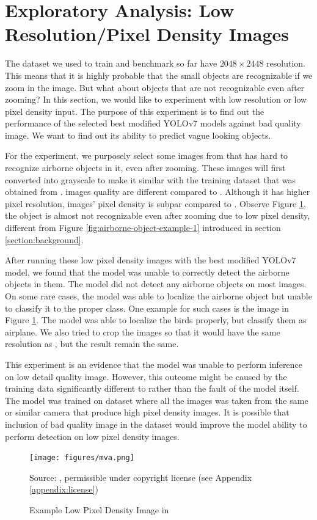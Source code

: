 \section{Exploratory Analysis: Low Resolution/Pixel Density Images}
The dataset we used to train and benchmark so far have $2048\times 2448$ resolution.
This means that it is highly probable that the small objects are recognizable if we zoom in the image.
But what about objects that are not recognizable even after zooming?
In this section, we would like to experiment with low resolution or low pixel density input.
The purpose of this experiment is to find out the performance of the selected best modified YOLOv7 models against
bad quality image. We want to find out its ability to predict vague looking objects.

For the experiment, we purposely select some images from \textcite{mva2023} that has hard to recognize airborne objects in it, even after zooming.
These images will first converted into grayscale to make it similar with the training dataset that was obtained from \textcite{aot_dataset}.
\textcite{mva2023} images quality are different compared to \textcite{aot_dataset}.
Although it has higher pixel resolution, \textcite{mva2023} images' pixel density is subpar compared to \textcite{aot_dataset}.
Observe Figure \ref{fig:mva}, the object is almost not recognizable even after zooming due to low pixel density, different from Figure \ref{fig:airborne-object-example-1} introduced in section \ref{section:background}.

After running these low pixel density images with the best modified YOLOv7 model, we found that the model was unable to correctly detect the airborne objects in them.
The model did not detect any airborne objects on most images. On some rare cases, the model was able to localize the airborne object but unable to classify it to the proper class.
One example for such cases is the image in Figure \ref{fig:mva}. The model was able to localize the birds properly, but classify them as airplane.
We also tried to crop the images so that it would have the same resolution as \textcite{aot_dataset}, but the result remain the same.

This experiment is an evidence that the model was unable to perform inference on low detail quality image.
However, this outcome might be caused by the training data significantly different to \textcite{mva2023} rather than the fault of the model itself.
The model was trained on dataset where all the images was taken from the same or similar camera that produce high pixel density images.
It is possible that inclusion of bad quality image in the dataset would improve the model ability to perform detection on low pixel density images.

\begin{figure}[btp]
  \centering
  \texttt{[image: figures/mva.png]}
  \caption*{Source: \textcite{mva2023}, permissible under copyright license (see Appendix \ref{appendix:license})}
  \caption{Example Low Pixel Density Image in \textcite{mva2023}}
  \label{fig:mva}
\end{figure}
